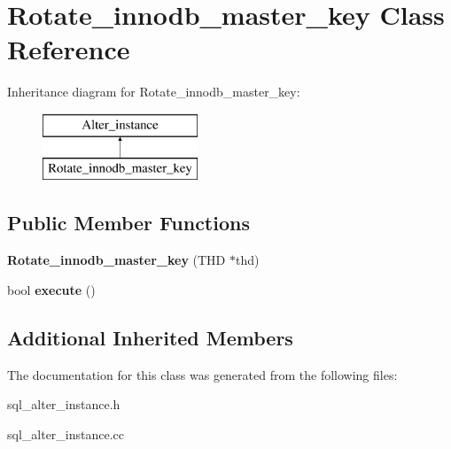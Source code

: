 \hypertarget{classRotate__innodb__master__key}{}\section{Rotate\+\_\+innodb\+\_\+master\+\_\+key Class Reference}
\label{classRotate__innodb__master__key}
Inheritance diagram for Rotate\+\_\+innodb\+\_\+master\+\_\+key\+:\begin{figure}[H]
\begin{center}
\leavevmode
\includegraphics[height=2.000000cm]{classRotate__innodb__master__key}
\end{center}
\end{figure}
\subsection*{Public Member Functions}
\begin{DoxyCompactItemize}
\item 
\mbox{\label{classRotate__innodb__master__key_ac338bee1f1c9d5c401b1559efd61c4c0}} 
{\bfseries Rotate\+\_\+innodb\+\_\+master\+\_\+key} (T\+HD $\ast$thd)
\item 
\mbox{\label{classRotate__innodb__master__key_a9aceff4bb905abe6bbdb334468bbef1f}} 
bool {\bfseries execute} ()
\end{DoxyCompactItemize}
\subsection*{Additional Inherited Members}


The documentation for this class was generated from the following files\+:\begin{DoxyCompactItemize}
\item 
sql\+\_\+alter\+\_\+instance.\+h\item 
sql\+\_\+alter\+\_\+instance.\+cc\end{DoxyCompactItemize}
